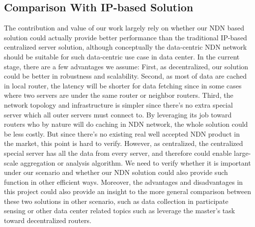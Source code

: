 \documentclass[journal]{IEEEtran}
\begin{document}
\subsection{Comparison With IP-based Solution}
The contribution and value of our work largely rely on whether our NDN 
based solution could actually provide better performance than the 
traditional IP-based centralized server solution, although 
conceptually the data-centric NDN network should be suitable for such 
data-centric use case in data center. In the current stage, there are 
a few advantages we assume: First, as decentralized, our solution 
could be better in robustness and scalability. Second, as most of data 
are cached in local router, the latency will be shorter for data 
fetching since in some cases where two servers are under the same 
router or neighbor routers. Third, the network topology and 
infrastructure is simpler since there’s no extra special server which 
all outer servers must connect to. By leveraging its job toward 
routers who by nature will do caching in NDN network, the whole 
solution could be less costly. But since there’s no existing real well 
accepted NDN product in the market, this point is hard to verify. 
However, as centralized, the centralized special server has all the 
data from every server, and therefore could enable large-scale 
aggregation or analysis algorithm. We need to verify whether it is 
important under our scenario and whether our NDN solution could also 
provide such function in other efficient ways. 
Moreover, the advantages and disadvantages in this project could also 
provide an insight to the more general comparison between these two 
solutions in other scenario, such as data collection in participate 
sensing or other data center related topics such as leverage the 
master’s task toward decentralized routers. 
\end{document}
